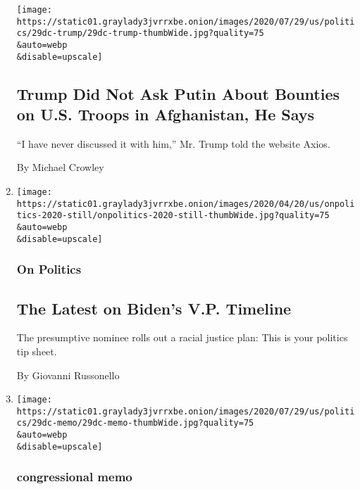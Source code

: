\begin{enumerate}
  \texttt{[image: https://static01.graylady3jvrrxbe.onion/images/2020/07/29/us/politics/29dc-trump/29dc-trump-thumbWide.jpg?quality=75\\\&auto=webp\\\&disable=upscale]}

  \hypertarget{trump-did-not-ask-putin-about-bounties-on-us-troops-in-afghanistan-he-says}{%
  \subsection{Trump Did Not Ask Putin About Bounties on U.S. Troops in
  Afghanistan, He
  Says}\label{trump-did-not-ask-putin-about-bounties-on-us-troops-in-afghanistan-he-says}}

  ``I have never discussed it with him,'' Mr. Trump told the website
  Axios.

  By Michael Crowley
\item
  \href{/2020/07/29/us/politics/biden-vp-announcement.html}{}

  \texttt{[image: https://static01.graylady3jvrrxbe.onion/images/2020/04/20/us/onpolitics-2020-still/onpolitics-2020-still-thumbWide.jpg?quality=75\\\&auto=webp\\\&disable=upscale]}

  \hypertarget{on-politics}{%
  \subsubsection{On Politics}\label{on-politics}}

  \hypertarget{the-latest-on-bidens-vp-timeline}{%
  \subsection{The Latest on Biden's V.P.
  Timeline}\label{the-latest-on-bidens-vp-timeline}}

  The presumptive nominee rolls out a racial justice plan: This is your
  politics tip sheet.

  By Giovanni Russonello
\item
  \href{/2020/07/29/us/politics/republicans-congress-virus-aid.html}{}

  \texttt{[image: https://static01.graylady3jvrrxbe.onion/images/2020/07/29/us/politics/29dc-memo/29dc-memo-thumbWide.jpg?quality=75\\\&auto=webp\\\&disable=upscale]}

  \hypertarget{congressional-memo}{%
  \subsubsection{congressional memo}\label{congressional-memo}}


\end{enumerate}
